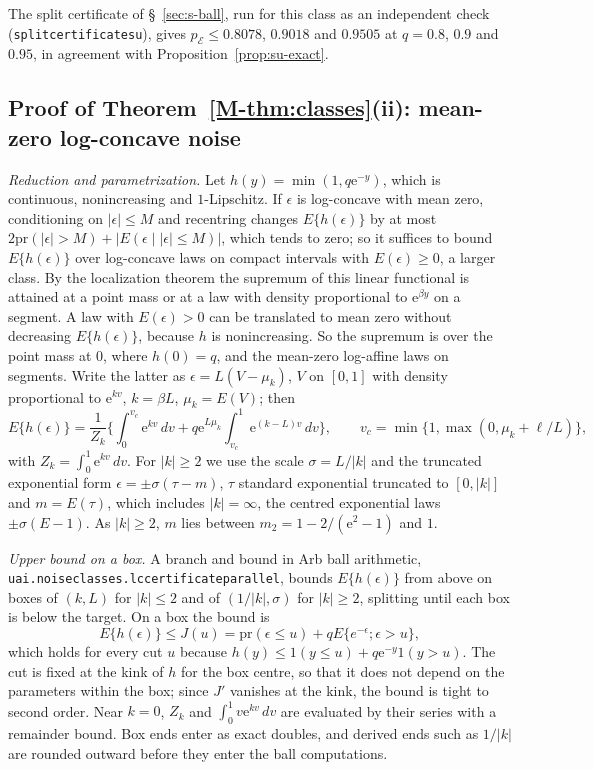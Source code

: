 \documentclass[11pt]{article}
\renewcommand{\_}{\usc\allowbreak}
\newcommand{\pr}{\mathrm{pr}}
\begin{document}
The split certificate of \S~\ref{sec:s-ball}, run for this class as an independent check (\texttt{split\_certificate\_su}), gives $p_{\mathcal E} \le 0.8078$, $0.9018$ and $0.9505$ at $q = 0.8$, $0.9$ and $0.95$, in agreement with Proposition~\ref{prop:su-exact}.

\subsection*{Proof of Theorem~\ref{M-thm:classes}(ii): mean-zero log-concave noise}

\emph{Reduction and parametrization.} Let $h(y) = \min(1, q \mathrm{e}^{-y})$, which is continuous, nonincreasing and $1$-Lipschitz. If $\epsilon$ is log-concave with mean zero, conditioning on $|\epsilon| \le M$ and recentring changes $E\{h(\epsilon)\}$ by at most $2\pr(|\epsilon| > M) + |E(\epsilon \mid |\epsilon| \le M)|$, which tends to zero; so it suffices to bound $E\{h(\epsilon)\}$ over log-concave laws on compact intervals with $E(\epsilon) \ge 0$, a larger class. By the localization theorem \citep{fradelizi2004} the supremum of this linear functional is attained at a point mass or at a law with density proportional to $\mathrm{e}^{\beta y}$ on a segment. A law with $E(\epsilon) > 0$ can be translated to mean zero without decreasing $E\{h(\epsilon)\}$, because $h$ is nonincreasing. So the supremum is over the point mass at $0$, where $h(0) = q$, and the mean-zero log-affine laws on segments. Write the latter as $\epsilon = L(V - \mu_k)$, $V$ on $[0, 1]$ with density proportional to $\mathrm{e}^{kv}$, $k = \beta L$, $\mu_k = E(V)$; then
\[
E\{h(\epsilon)\} = \frac{1}{Z_k}\Big\{\int_0^{v_c} \mathrm{e}^{kv}\,dv + q \mathrm{e}^{L\mu_k}\int_{v_c}^1 \mathrm{e}^{(k - L)v}\,dv\Big\}, \qquad v_c = \min\{1, \max(0, \mu_k + \ell/L)\},
\]
with $Z_k = \int_0^1 \mathrm{e}^{kv}\,dv$. For $|k| \ge 2$ we use the scale $\sigma = L/|k|$ and the truncated exponential form $\epsilon = \pm\sigma(\tau - m)$, $\tau$ standard exponential truncated to $[0, |k|]$ and $m = E(\tau)$, which includes $|k| = \infty$, the centred exponential laws $\pm\sigma(E - 1)$. As $|k| \ge 2$, $m$ lies between $m_2 = 1 - 2/(\mathrm{e}^2 - 1)$ and $1$.

\emph{Upper bound on a box.} A branch and bound in Arb ball arithmetic, \texttt{uai.noise\_classes.lc\_certificate\_parallel}, bounds $E\{h(\epsilon)\}$ from above on boxes of $(k, L)$ for $|k| \le 2$ and of $(1/|k|, \sigma)$ for $|k| \ge 2$, splitting until each box is below the target. On a box the bound is
\[
E\{h(\epsilon)\} \le J(u) = \pr(\epsilon \le u) + q E\{e^{-\epsilon}; \epsilon > u\},
\]
which holds for every cut $u$ because $h(y) \le 1(y \le u) + q \mathrm{e}^{-y} 1(y > u)$. The cut is fixed at the kink of $h$ for the box centre, so that it does not depend on the parameters within the box; since $J'$ vanishes at the kink, the bound is tight to second order. Near $k = 0$, $Z_k$ and $\int_0^1 v \mathrm{e}^{kv}\,dv$ are evaluated by their series with a remainder bound. Box ends enter as exact doubles, and derived ends such as $1/|k|$ are rounded outward before they enter the ball computations.
\end{document}
